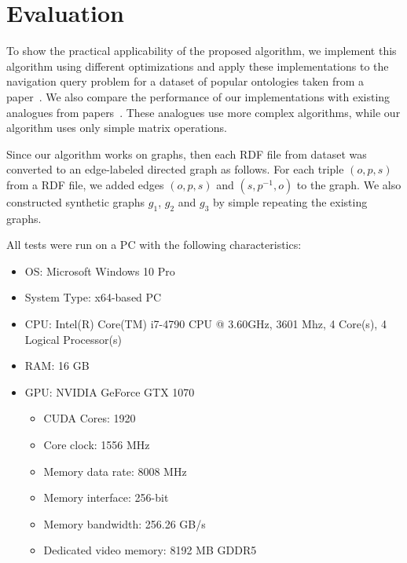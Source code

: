 \section{Evaluation}
To show the practical applicability of the proposed algorithm, we implement this algorithm using different optimizations and apply these implementations to the navigation query problem for a dataset of popular ontologies taken from a paper~\cite{RDF}. We also compare the performance of our implementations with existing analogues from papers~\cite{GLL,RDF}. These analogues use more complex algorithms, while our algorithm uses only simple matrix operations.

Since our algorithm works on graphs, then each RDF file from dataset was converted to an edge-labeled directed graph as follows. For each triple $(o,p,s)$ from a RDF file, we added edges $(o,p,s)$ and $(s,p^{-1},o)$ to the graph. We also constructed synthetic graphs $g_1$, $g_2$ and $g_3$ by simple repeating the existing graphs.

All tests were run on a PC with the following characteristics:
\begin{itemize}
    \item OS: Microsoft Windows 10 Pro
    \item System Type: x64-based PC
    \item CPU: Intel(R) Core(TM) i7-4790 CPU @ 3.60GHz, 3601 Mhz, 4 Core(s), 4 Logical Processor(s)
    \item RAM: 16 GB
    \item GPU: NVIDIA GeForce GTX 1070
    \begin{itemize}
        \item CUDA Cores:		1920 
        \item Core clock:		1556 MHz 
        \item Memory data rate:	8008 MHz
        \item Memory interface:	256-bit 
        \item Memory bandwidth:	256.26 GB/s
        \item Dedicated video memory:	8192 MB GDDR5
    \end{itemize}
\end{itemize}

